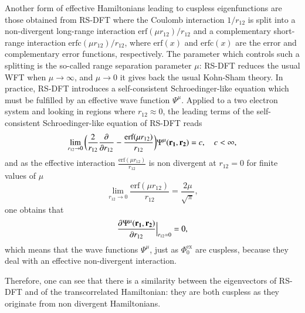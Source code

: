 \documentclass[aip,jcp,reprint,noshowkeys,superscriptaddress]{revtex4-1}
\newcommand{\deriv}[3]{\frac{\partial^{#3} #1}{\partial {#2}^{#3}}}
\newcommand{\bd}[1]{{\bf {#1}}}
\newcommand{\phiex}[0]{\Phi^{\text{ex}}_0}
\begin{document}
Another form of effective Hamiltonians leading to cuspless eigenfunctions are those obtained from RS-DFT 
where the Coulomb interaction $1/r_{12}$ is split into a non-divergent long-range interaction $\text{erf}(\mu r_{12})/r_{12}$ and a complementary short-range interaction $\text{erfc}(\mu r_{12})/r_{12}$, where $\text{erf}(x)$ and $\text{erfc}(x)$ are the error and complementary error functions, respectively. 
The parameter which controls such a splitting is the so-called range separation parameter $\mu$:  RS-DFT reduces the usual WFT when $\mu \rightarrow \infty$, and $\mu \rightarrow 0$ it gives back the usual Kohn-Sham theory.  
In practice, RS-DFT introduces a self-consistent Schroedinger-like equation which must be fulfilled by an effective wave function  $\Psi^\mu$.
Applied to a two electron system and looking in regions where $r_{12}\approx 0$, the leading terms of the self-consistent Schroedinger-like equation of RS-DFT reads 
\begin{equation}
 \label{eq:cusp_psi_mu_0}
 \lim_{r_{12}\rightarrow 0}\bigg( \frac{2}{r_{12}} \deriv{}{r_{12}}{} -\frac{\text{erf}(\mu r_{12})}{r_{12}}\bigg) \Psi^\mu(\bd{r_1},\bd{r_2})  = c,\quad c<\infty,  
\end{equation}
and as the effective interaction $\frac{\text{erf}(\mu r_{12})}{r_{12}}$ is non divergent at $r_{12}=0$ for finite values of $\mu$
\begin{equation}
 \lim_{r_{12} \rightarrow 0} \frac{\text{erf}(\mu r_{12})}{r_{12}} = \frac{2 \mu}{\sqrt{\pi}} , 
\end{equation}
one obtains that 
\begin{equation}
 \label{eq:cusp_psi_mu_1}
 \deriv{\Psi^\mu(\bd{r_1},\bd{r_2})}{r_{12}}{}\Bigr|_{r_{12}=0} = 0, 
\end{equation}
which means that the wave functions $\Psi^\mu$, just as $\phiex$ are cuspless, because they deal with an effective non-divergent interaction. 

Therefore, one can see that there is a similarity between the eigenvectors of RS-DFT and of the transcorrelated Hamiltonian: they are both cuspless as they originate from non divergent Hamiltonians. 
\end{document}
